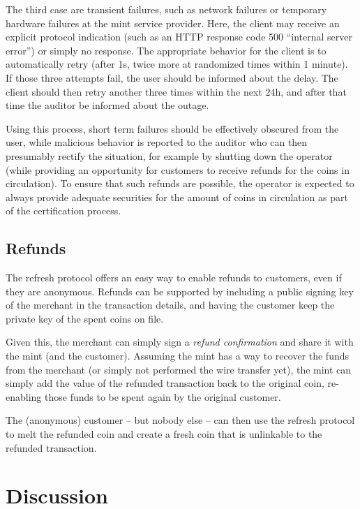 \documentclass{llncs}
\begin{document}
The third case are transient failures, such as network failures or
temporary hardware failures at the mint service provider.  Here, the
client may receive an explicit protocol indication (such as an HTTP
response code 500 ``internal server error'') or simply no response.
The appropriate behavior for the client is to automatically retry
(after 1s, twice more at randomized times within 1 minute). If those
three attempts fail, the user should be informed about the delay.  The
client should then retry another three times within the next 24h, and
after that time the auditor be informed about the outage.

Using this process, short term failures should be effectively obscured
from the user, while malicious behavior is reported to the auditor who
can then presumably rectify the situation, for example by shutting
down the operator (while providing an opportunity for customers to
receive refunds for the coins in circulation).  To ensure that such
refunds are possible, the operator is expected to always provide
adequate securities for the amount of coins in circulation as part of
the certification process.

\subsection{Refunds}

The refresh protocol offers an easy way to enable refunds to
customers, even if they are anonymous.  Refunds can be supported
by including a public signing key of the merchant in the transaction
details, and having the customer keep the private key of the spent
coins on file.

Given this, the merchant can simply sign a {\em refund confirmation}
and share it with the mint (and the customer).  Assuming the mint has
a way to recover the funds from the merchant (or simply not performed
the wire transfer yet), the mint can simply add the value of the
refunded transaction back to the original coin, re-enabling those
funds to be spent again by the original customer.

The (anonymous) customer -- but nobody else -- can then use the
refresh protocol to melt the refunded coin and create a fresh coin
that is unlinkable to the refunded transaction.


\section{Discussion}
\end{document}

